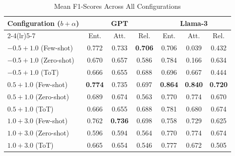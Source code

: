 \begin{table}[t]
\scriptsize
\centering
\caption{Mean F1-Scores Across All Configurations}
\label{tab:mean_f1_all}
\setlength{\tabcolsep}{5pt}
\begin{tabular}{l|ccc|ccc}
\toprule
\multirow{2}{*}{Configuration ($b + \alpha$)}
    & \multicolumn{3}{c|}{GPT}
    & \multicolumn{3}{c}{Llama-3} \\
\cmidrule(lr){2-4}\cmidrule(lr){5-7}
    & Ent. & Att. & Rel.
    & Ent. & Att. & Rel. \\
\midrule
$-0.5 + 1.0$ (Few-shot) & 0.772 & 0.733 & \textbf{0.706} & 0.706 & 0.039 & 0.432 \\
$-0.5 + 1.0$ (Zero-shot) & 0.670 & 0.657 & 0.586 & 0.784 & 0.166 & 0.634 \\
$-0.5 + 1.0$ (ToT) & 0.666 & 0.655 & 0.688 & 0.696 & 0.667 & 0.444 \\
\addlinespace
$0.5 + 1.0$ (Few-shot) & \textbf{0.774} & 0.735 & 0.697 & \textbf{0.864} & \textbf{0.840} & \textbf{0.720} \\
$0.5 + 1.0$ (Zero-shot) & 0.689 & 0.674 & 0.563 & 0.770 & 0.774 & 0.670 \\
$0.5 + 1.0$ (ToT) & 0.666 & 0.655 & 0.688 & 0.781 & 0.680 & 0.674 \\
\addlinespace
$1.0 + 3.0$ (Few-shot) & 0.762 & \textbf{0.736} & 0.698 & 0.758 & 0.729 & 0.625 \\
$1.0 + 3.0$ (Zero-shot) & 0.596 & 0.594 & 0.564 & 0.770 & 0.774 & 0.674 \\
$1.0 + 3.0$ (ToT) & 0.665 & 0.654 & 0.546 & 0.777 & 0.672 & 0.505 \\
\bottomrule
\end{tabular}
\end{table}
